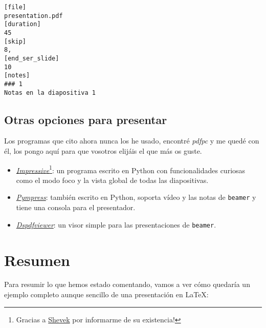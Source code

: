 \begin{lstlisting}
[file]
presentation.pdf
[duration]
45
[skip]
8,
[end_ser_slide]
10
[notes]
### 1
Notas en la diapositiva 1
\end{lstlisting}

\subsection{Otras opciones para
presentar}

Los programas que cito ahora nunca los he usado, encontré \emph{pdfpc} y
me quedé con él, los pongo aquí para que vosotros elijáis el que más os
guste.

\begin{itemize}
\item
  \href{http://impressive.sourceforge.net/}{\emph{Impressive}}\footnote{Gracias
    a \href{https://quitter.se/notice/9129937}{Shevek} por informarme de
    su existencia!}: un programa escrito en Python con funcionalidades
  curiosas como el modo foco y la vista global de todas las
  diapositivas.
\item
  \href{https://github.com/Cimbali/pympress}{\emph{Pympress}}: también
  escrito en Python, soporta vídeo y las notas de \lstinline!beamer! y
  tiene una consola para el presentador.
\item
  \href{https://github.com/dannyedel/dspdfviewer}{\emph{Dspdfviewer}}:
  un visor simple para las presentaciones de \lstinline!beamer!.
\end{itemize}

\section{Resumen}

Para resumir lo que hemos estado comentando, vamos a ver cómo quedaría
un ejemplo completo aunque sencillo de una presentación en LaTeX:

